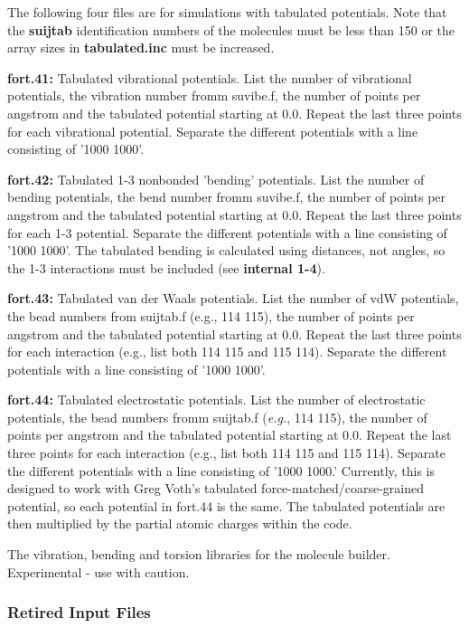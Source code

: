 \documentclass[12pt,letterpaper]{article}
\begin{document}
{{{{{{\noindent The following four files are for simulations with tabulated potentials.  Note that the {\bf suijtab} identification numbers of the
molecules must be less than 150 or the array sizes in {\bf tabulated.inc} must be increased.

\noindent \textbf{fort.41:}  Tabulated vibrational potentials.  List the number of vibrational potentials, the 
vibration number fromm suvibe.f, the number of points per angstrom and the tabulated potential
starting at 0.0.  Repeat the last three points for each vibrational potential.  Separate the different
potentials with a line consisting of '1000 1000'.

\noindent \textbf{fort.42:}  Tabulated 1-3 nonbonded 'bending' potentials.  List the number of bending potentials, the bend number fromm suvibe.f, the number of points per angstrom and the tabulated potential
starting at 0.0.  Repeat the last three points for each 1-3 potential.  Separate the different potentials
with a line consisting of '1000 1000'.
The tabulated bending is calculated using distances, not angles, so the 1-3 interactions
must be included (see \textbf{internal 1-4}).

\noindent \textbf{fort.43:}  Tabulated van der Waals potentials.  List the number of vdW potentials, the 
bead numbers from suijtab.f (e.g., 114 115), the number of points per angstrom and the tabulated potential
starting at 0.0.  Repeat the last three points for each interaction (e.g., list both 114 115 and 115 114).  
Separate the different potentials with a line consisting of '1000 1000'.

\noindent \textbf{fort.44:}  Tabulated electrostatic potentials.  List the number of electrostatic potentials, the 
bead numbers fromm suijtab.f (\textit{e.g.}, 114 115), the number of points per angstrom and the tabulated potential starting at 0.0.  Repeat the last three points for each interaction (e.g., list both 114 115 and 115 114).  
Separate the different potentials with a line consisting of '1000 1000.'  Currently, this is designed to
work with Greg Voth's tabulated force-matched/coarse-grained potential, so each potential in fort.44 is the same.
The tabulated potentials are then multiplied by the partial atomic charges within the code.

The vibration, bending and torsion libraries for the molecule builder.
Experimental - use with caution.

\subsubsection{Retired Input Files}

}}}}}}
\end{document}
